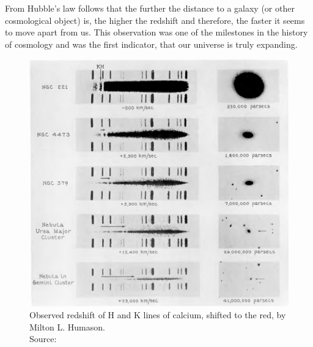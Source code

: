 \noindent From Hubble's law follows that the further the distance to a galaxy (or other cosmological object) is, the higher the redshift and therefore, the faster it seems to move apart from us. This observation was one of the milestones in the history of cosmology and was the first indicator, that our universe is truly expanding.


\begin{figure}[H]
    \begin{minipage}{8cm}
        \centering 
        \includegraphics[scale=0.3]{figures/images/humason_redshifts-in-the-spectra-of-extra-galactic-nebulae.png}
        \caption{Observed redshift of H and K lines of calcium, shifted to the red, by Milton L. Humason.  \\ 
        Source: \cite[Figure ``Red-shifts in the Spectra of Extra-galactic Nebulae'']{Humason1936}}
    \end{minipage}
    \hspace{1cm}
    \begin{minipage}{8cm}
        \centering

\end{minipage}
\end{figure}
